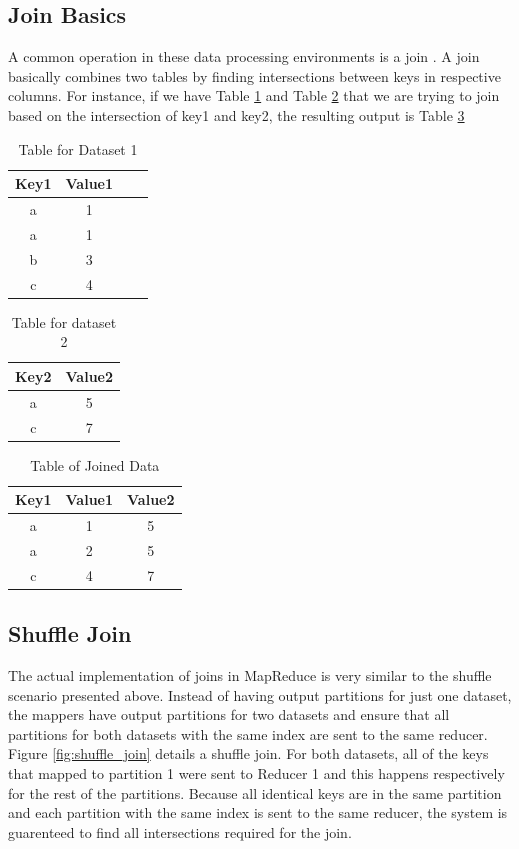 \subsection{Join Basics}

A common operation in these data processing environments is a join \cite{join}.
A join basically combines two tables by finding intersections between
keys in respective columns. For instance, if we have   
Table \ref{table:join1} and Table \ref{table:join2} that we are trying to join based on the intersection
of key1 and key2, the resulting output is Table \ref{table:join3}   
\begin{table}[h!]
\centering
 \begin{tabular}{|c |c |c |c|}
  \hline
   Key1 & Value1 \\
  \hline
   a & 1 \\
  \hline
   a & 1 \\
  \hline
   b & 3 \\
  \hline
   c & 4 \\
  \hline
\end{tabular}
\caption{Table for Dataset 1}
\label{table:join1}
\end{table}

\begin{table}[h!]
\centering
 \begin{tabular}{|c |c|}
  \hline
   Key2 & Value2 \\
  \hline
   a & 5 \\
  \hline
   c & 7 \\
  \hline
\end{tabular}
\caption{Table for dataset 2}
\label{table:join2}
\end{table}

\begin{table}[h!]
\centering
 \begin{tabular}{|c |c |c|}
  \hline
   Key1 & Value1 & Value2  \\
  \hline
   a & 1 & 5 \\
  \hline
   a & 2 & 5 \\
  \hline
   c & 4 & 7 \\
  \hline
\end{tabular}
\caption{Table of Joined Data}
\label{table:join3}
\end{table}

\subsection{Shuffle Join}
The actual implementation of joins in MapReduce is very similar to the
shuffle scenario presented above. Instead of having output partitions for just one dataset,
the mappers have output partitions for two datasets and ensure that all partitions for both datasets with the same index 
are sent to the same reducer.  
Figure \ref{fig:shuffle_join} details a shuffle join.
For both datasets, all of the keys that 
mapped to partition 1 were sent to Reducer 1 and this happens respectively for the rest of the partitions. Because
all identical keys are in the same partition and each partition with the same index is sent to the same reducer,
the system is guarenteed to find all intersections required for the join.

